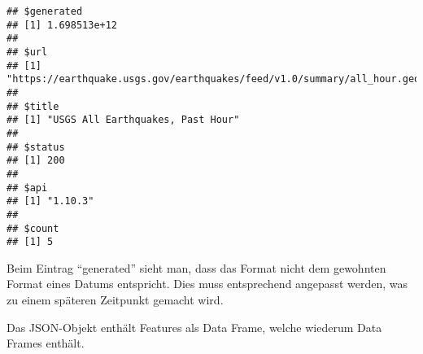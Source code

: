 \documentclass[
]{article}
\newenvironment{Shaded}{\begin{snugshade}}{\end{snugshade}}
\newcommand{\NormalTok}[1]{#1}
\newcommand{\OtherTok}[1]{\textcolor[rgb]{0.56,0.35,0.01}{#1}}
\newcommand{\SpecialCharTok}[1]{\textcolor[rgb]{0.81,0.36,0.00}{\textbf{#1}}}
\begin{document}
\begin{verbatim}
## $generated
## [1] 1.698513e+12
## 
## $url
## [1] "https://earthquake.usgs.gov/earthquakes/feed/v1.0/summary/all_hour.geojson"
## 
## $title
## [1] "USGS All Earthquakes, Past Hour"
## 
## $status
## [1] 200
## 
## $api
## [1] "1.10.3"
## 
## $count
## [1] 5
\end{verbatim}

Beim Eintrag ``generated'' sieht man, dass das Format nicht dem
gewohnten Format eines Datums entspricht. Dies muss entsprechend
angepasst werden, was zu einem späteren Zeitpunkt gemacht wird.

Das JSON-Objekt enthält Features als Data Frame, welche wiederum Data
Frames enthält.

\begin{Shaded}
\end{Shaded}
\end{document}

